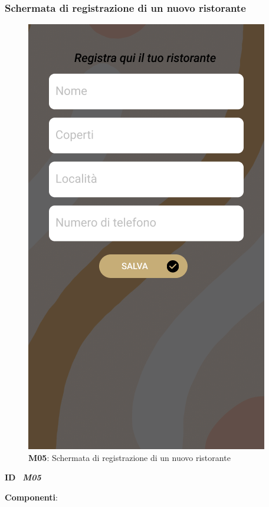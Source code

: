         \subsubsection{Schermata di registrazione di un nuovo ristorante}
        \begin{figure}[H]
            \centering
            \includegraphics[scale=0.35]{assets/Mockup/Mockup_SaveResturant.png}
            \caption{\textbf{M05}: Schermata di registrazione di un nuovo ristorante}\label{fig:Mockup_AddResturant}
        \end{figure}
        \begin{flushleft}
            \textbf{ID} \ \Large{\textit{\textbf{M05}}}
        \end{flushleft}
        \textbf{Componenti}:


